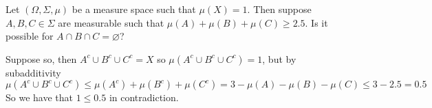 \bexerc

    Let $(\Omega,\Sigma,\mu)$ be a measure space such that $\mu(X)=1$.
    Then suppose $A,B,C\in\Sigma$ are measurable such that $\mu(A)+\mu(B)+\mu(C)\geq2.5$.
    Is it possible for $A\cap B\cap C=\varnothing$?

\eexerc

Suppose so, then $A^c\cup B^c\cup C^c=X$ so $\mu(A^c\cup B^c\cup C^c)=1$, but by subadditivity
$$ \mu(A^c\cup B^c\cup C^c) \leq \mu(A^c) + \mu(B^c) + \mu(C^c) = 3 - \mu(A) - \mu(B) - \mu(C) \leq 3 - 2.5 = 0.5 $$
So we have that $1\leq0.5$ in contradiction.

\bye

